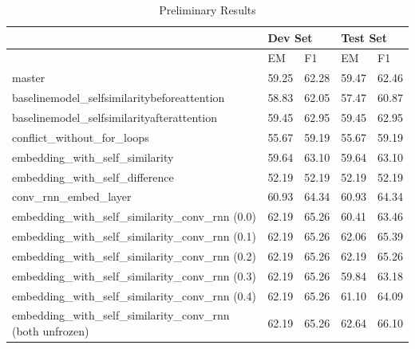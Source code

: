 \begin{table}[]

    \caption{Preliminary Results}
    \label{table:results} 
    \centering
		
\begin{tabular}{|l|l|l|l|l|}
\hline
                                                                & \multicolumn{2}{l|}{\textbf{Dev Set}} & \multicolumn{2}{l|}{\textbf{Test Set}} \\ \hline
                                                                & EM                & F1                & EM                 & F1                \\ \hline
master                        				                          & 59.25             & 62.28             & 59.47              & 62.46             \\ \hline
baselinemodel\_selfsimilaritybeforeattention								 		& 58.83             & 62.05             & 57.47              & 60.87             \\ \hline
baselinemodel\_selfsimilarityafterattention								 			& 59.45             & 62.95             & 59.45              & 62.95             \\ \hline
conflict\_without\_for\_loops																 		& 55.67             & 59.19             & 55.67              & 59.19             \\ \hline
embedding\_with\_self\_similarity                               & 59.64             & 63.10             & 59.64              & 63.10             \\ \hline
embedding\_with\_self\_difference                               & 52.19             & 52.19             & 52.19              & 52.19             \\ \hline
conv\_rnn\_embed\_layer							                  	        & 60.93             & 64.34             & 60.93              & 64.34             \\ \hline
embedding\_with\_self\_similarity\_conv\_rnn (0.0)              & 62.19             & 65.26             & 60.41              & 63.46             \\ \hline
embedding\_with\_self\_similarity\_conv\_rnn (0.1)              & 62.19             & 65.26             & 62.06              & 65.39             \\ \hline
embedding\_with\_self\_similarity\_conv\_rnn (0.2)              & 62.19             & 65.26             & 62.19              & 65.26             \\ \hline
embedding\_with\_self\_similarity\_conv\_rnn (0.3)              & 62.19             & 65.26             & 59.84              & 63.18             \\ \hline
embedding\_with\_self\_similarity\_conv\_rnn (0.4)              & 62.19             & 65.26             & 61.10              & 64.09             \\ \hline
embedding\_with\_self\_similarity\_conv\_rnn (both unfrozen)    & 62.19             & 65.26             & 62.64              & 66.10             \\ \hline
\end{tabular}
		
\end{table}

